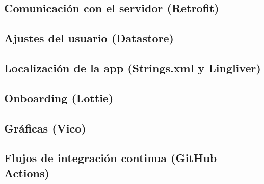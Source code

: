        \subsection{Comunicación con el servidor (Retrofit)}
        \subsection{Ajustes del usuario (Datastore)}
        \subsection{Localización de la app (Strings.xml y Lingliver)}
        \subsection{Onboarding (Lottie)}
        \subsection{Gráficas (Vico)}
        \subsection{Flujos de integración continua (GitHub Actions)}
            
            
            